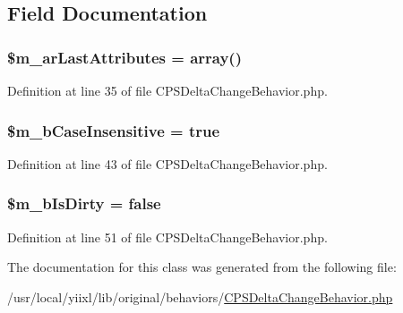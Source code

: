\subsection{Field Documentation}
\hypertarget{classCPSDeltaChangeBehavior_ad842cf610c9bdd9e1ec9235f3f4ccb88}{
\subsubsection[{\$m\_\-arLastAttributes}]{\setlength{\rightskip}{0pt plus 5cm}\$m\_\-arLastAttributes = {\bf array}()}}
\label{classCPSDeltaChangeBehavior_ad842cf610c9bdd9e1ec9235f3f4ccb88}


Definition at line 35 of file CPSDeltaChangeBehavior.php.

\hypertarget{classCPSDeltaChangeBehavior_a8aece4f3a3d397467cae1e8dc6613454}{
\subsubsection[{\$m\_\-bCaseInsensitive}]{\setlength{\rightskip}{0pt plus 5cm}\$m\_\-bCaseInsensitive = true}}
\label{classCPSDeltaChangeBehavior_a8aece4f3a3d397467cae1e8dc6613454}


Definition at line 43 of file CPSDeltaChangeBehavior.php.

\hypertarget{classCPSDeltaChangeBehavior_a9edb581e40571436a736bfdfbc9c0a75}{
\subsubsection[{\$m\_\-bIsDirty}]{\setlength{\rightskip}{0pt plus 5cm}\$m\_\-bIsDirty = false}}
\label{classCPSDeltaChangeBehavior_a9edb581e40571436a736bfdfbc9c0a75}


Definition at line 51 of file CPSDeltaChangeBehavior.php.



The documentation for this class was generated from the following file:\begin{DoxyCompactItemize}
\item 
/usr/local/yiixl/lib/original/behaviors/\hyperlink{CPSDeltaChangeBehavior_8php}{CPSDeltaChangeBehavior.php}\end{DoxyCompactItemize}
